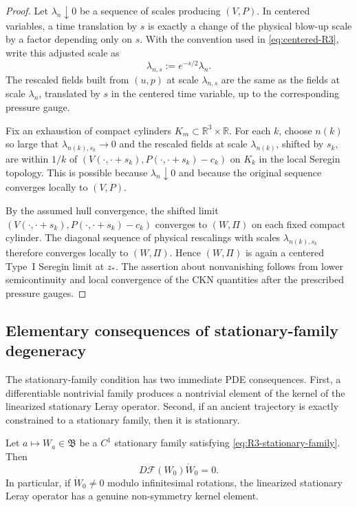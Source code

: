 \begin{proof}
Let \(\lambda_n\downarrow0\) be a sequence of scales producing \((V,P)\).  In
centered variables, a time translation by \(s\) is exactly a change of the
physical blow-up scale by a factor depending only on \(s\).  With the convention
used in \eqref{eq:centered-R3}, write this adjusted scale as
\begin{equation}\label{eq:R3-adjusted-scale}
   \lambda_{n,s}:=e^{-s/2}\lambda_n .
\end{equation}
The rescaled fields built from \((u,p)\) at scale \(\lambda_{n,s}\) are the same
as the fields at scale \(\lambda_n\), translated by \(s\) in the centered time
variable, up to the corresponding pressure gauge.

Fix an exhaustion of compact cylinders \(K_m\subset\mathbb R^3\times\mathbb R\).
For each \(k\), choose \(n(k)\) so large that \(\lambda_{n(k),s_k}\to0\) and the
rescaled fields at scale \(\lambda_{n(k)}\), shifted by \(s_k\), are within
\(1/k\) of \((V(\cdot,\cdot+s_k),P(\cdot,\cdot+s_k)-c_k)\) on \(K_k\) in the
local Seregin topology.  This is possible because \(\lambda_n\downarrow0\) and
because the original sequence converges locally to \((V,P)\).

By the assumed hull convergence, the shifted limit
\((V(\cdot,\cdot+s_k),P(\cdot,\cdot+s_k)-c_k)\) converges to \((W,\Pi)\) on each
fixed compact cylinder.  The diagonal sequence of physical rescalings with
scales \(\lambda_{n(k),s_k}\) therefore converges locally to \((W,\Pi)\).  Hence
\((W,\Pi)\) is again a centered Type~I Seregin limit at \(z_*\).  The assertion
about nonvanishing follows from lower semicontinuity and local convergence of
the CKN quantities after the prescribed pressure gauges.
\end{proof}

\subsection{Elementary consequences of stationary-family degeneracy}

The stationary-family condition has two immediate PDE consequences.  First, a differentiable
nontrivial family produces a nontrivial element of the kernel of the linearized
stationary Leray operator.  Second, if an ancient trajectory is exactly
constrained to a stationary family, then it is stationary.

\begin{lemma}
\label{lem:R3-family-kernel}
Let \(a\mapsto W_a\in\mathfrak B\) be a \(C^1\) stationary family satisfying
\eqref{eq:R3-stationary-family}.  Then
\begin{equation}\label{eq:R3-kernel}
   D\mathcal F(W_0)\dot W_0=0 .
\end{equation}
In particular, if \(\dot W_0\ne0\) modulo infinitesimal rotations, the
linearized stationary Leray operator has a genuine non-symmetry kernel element.
\end{lemma}

